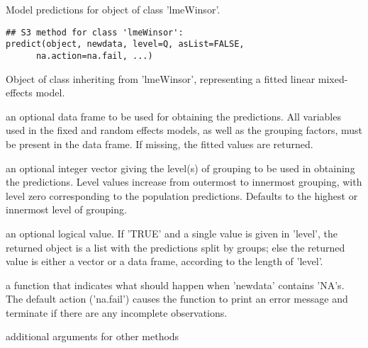 \documentclass{article}
\begin{document}
\begin{Description}\relax
Model predictions for object of class 'lmeWinsor'.
\end{Description}
\begin{Usage}
\begin{verbatim}
## S3 method for class 'lmeWinsor':
predict(object, newdata, level=Q, asList=FALSE,
      na.action=na.fail, ...)
\end{verbatim}
\end{Usage}
\begin{Arguments}
\begin{ldescription}
\item[\code{ object }] Object of class inheriting from 'lmeWinsor', representing a fitted
linear mixed-effects model.  

\item[\code{ newdata }] an optional data frame to be used for obtaining the predictions. All
variables used in the fixed and random effects models, as well as
the grouping factors, must be present in the data frame. If missing,
the fitted values are returned.

\item[\code{ level }] an optional integer vector giving the level(s) of grouping to be
used in obtaining the predictions. Level values increase from
outermost to innermost grouping, with level zero corresponding to
the population predictions. Defaults to the highest or innermost
level of grouping. 

\item[\code{ asList }] an optional logical value. If 'TRUE' and a single value is given in
'level', the returned object is a list with the predictions split by
groups; else the returned value is either a vector or a data frame,
according to the length of 'level'. 

\item[\code{na.action}] a function that indicates what should happen when 'newdata' contains
'NA's.  The default action ('na.fail') causes the function to print
an error message and terminate if there are any incomplete
observations. 

\item[\code{...}] additional arguments for other methods

\end{ldescription}
\end{Arguments}
\end{document}
